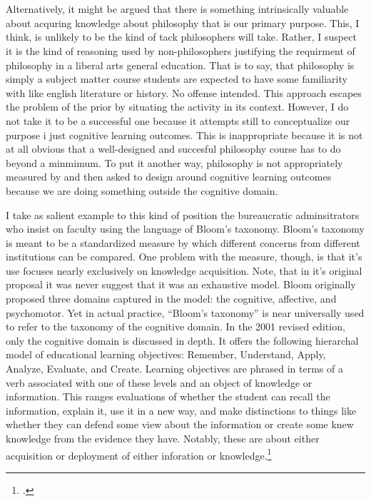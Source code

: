 \documentclass[letterpaper,notitlepage,12pt]{article}
\begin{document}
\section{}


Alternatively, it might be argued that there is something intrinsically valuable
about acquring knowledge about philosophy that is our primary purpose.
This, I think, is unlikely to be the kind of tack philosophers will take.
Rather, I suspect it is the kind of reasoning used by non-philosophers
justifying the requirment of philosophy in a liberal arts general education.
That is to say, that philosophy is simply a subject matter course students are
expected to have some familiarity with like english literature or history.
No offense intended.
This approach escapes the problem of the prior by situating the activity in its
context.
However, I do not take it to be a successful one because it attempts still to
conceptualize our purpose i just cognitive learning outcomes.
This is inappropriate because it is not at all obvious that a well-designed and
succesful philosophy course has to do beyond a minmimum.
To put it another way, philosophy is not appropriately measured by and then
asked to design around cognitive learning outcomes because we are doing
something outside the cognitive domain.

I take as salient example to this kind of position the
bureaucratic adminsitrators who insist on faculty using the language of Bloom's
taxonomy.
Bloom's taxonomy is meant to be a standardized measure by which different
concerns from different institutions can be compared.
One problem with the measure, though, is that it's use focuses nearly
exclusively on knowledge acquisition.
Note, that in it's original proposal it was never suggest that it was an
exhaustive model.
Bloom originally proposed three domains captured in the model: the
cognitive, affective, and psychomotor.
Yet in actual practice, ``Bloom's taxonomy'' is near universally used to refer
to the taxonomy of the cognitive domain.
In the 2001 revised edition, only the cognitive domain is discussed in depth.
It offers the following hierarchal model of educational learning objectives:
Remember, Understand, Apply, Analyze, Evaluate, and Create.
Learning objectives are phrased in terms of a verb associated with one of these
levels and an object of knowledge or information.
This ranges evaluations of whether the student can recall the information,
explain it, use it in a new way, and make distinctions to things like whether
they can defend some view about the information or create some knew knowledge
from the evidence they have.
Notably, these are about either acquisition or deployment of either inforation
or knowledge.\footcite{armstrong_blooms_nodate}
\end{document}
